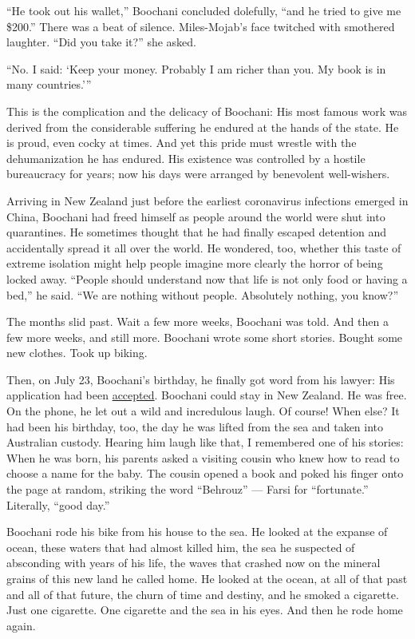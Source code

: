 ``He took out his wallet,'' Boochani concluded dolefully, ``and he tried
to give me \$200.'' There was a beat of silence. Miles-Mojab's face
twitched with smothered laughter. ``Did you take it?'' she asked.

``No. I said: `Keep your money. Probably I am richer than you. My book
is in many countries.'''

This is the complication and the delicacy of Boochani: His most famous
work was derived from the considerable suffering he endured at the hands
of the state. He is proud, even cocky at times. And yet this pride must
wrestle with the dehumanization he has endured. His existence was
controlled by a hostile bureaucracy for years; now his days were
arranged by benevolent well-wishers.

Arriving in New Zealand just before the earliest coronavirus infections
emerged in China, Boochani had freed himself as people around the world
were shut into quarantines. He sometimes thought that he had finally
escaped detention and accidentally spread it all over the world. He
wondered, too, whether this taste of extreme isolation might help people
imagine more clearly the horror of being locked away. ``People should
understand now that life is not only food or having a bed,'' he said.
``We are nothing without people. Absolutely nothing, you know?''

The months slid past. Wait a few more weeks, Boochani was told. And then
a few more weeks, and still more. Boochani wrote some short stories.
Bought some new clothes. Took up biking.

Then, on July 23, Boochani's birthday, he finally got word from his
lawyer: His application had been
\href{https://www.nytimes3xbfgragh.onion/2020/07/24/world/australia/behrouz-boochani-asylum-new-zealand.html}{accepted}.
Boochani could stay in New Zealand. He was free. On the phone, he let
out a wild and incredulous laugh. Of course! When else? It had been his
birthday, too, the day he was lifted from the sea and taken into
Australian custody. Hearing him laugh like that, I remembered one of his
stories: When he was born, his parents asked a visiting cousin who knew
how to read to choose a name for the baby. The cousin opened a book and
poked his finger onto the page at random, striking the word ``Behrouz''
--- Farsi for ``fortunate.'' Literally, ``good day.''

Boochani rode his bike from his house to the sea. He looked at the
expanse of ocean, these waters that had almost killed him, the sea he
suspected of absconding with years of his life, the waves that crashed
now on the mineral grains of this new land he called home. He looked at
the ocean, at all of that past and all of that future, the churn of time
and destiny, and he smoked a cigarette. Just one cigarette. One
cigarette and the sea in his eyes. And then he rode home again.

